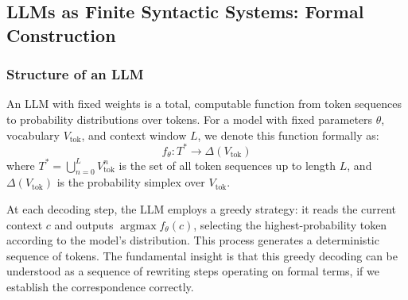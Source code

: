 \documentclass[11pt]{article}
\begin{document}
\subsection{LLMs as Finite Syntactic Systems: Formal Construction}

\subsubsection{Structure of an LLM}

An LLM with fixed weights is a total, computable function from token sequences to probability distributions over tokens. For a model with fixed parameters $\theta$, vocabulary $V_{\text{tok}}$, and context window $L$, we denote this function formally as:
\begin{equation}
f_\theta: T^* \to \Delta(V_{\text{tok}})
\end{equation}
where $T^* = \bigcup_{n=0}^L V_{\text{tok}}^n$ is the set of all token sequences up to length $L$, and $\Delta(V_{\text{tok}})$ is the probability simplex over $V_{\text{tok}}$.

At each decoding step, the LLM employs a greedy strategy: it reads the current context $c$ and outputs $\operatorname{argmax} f_\theta(c)$, selecting the highest-probability token according to the model's distribution. This process generates a deterministic sequence of tokens. The fundamental insight is that this greedy decoding can be understood as a sequence of rewriting steps operating on formal terms, if we establish the correspondence correctly.
\end{document}
